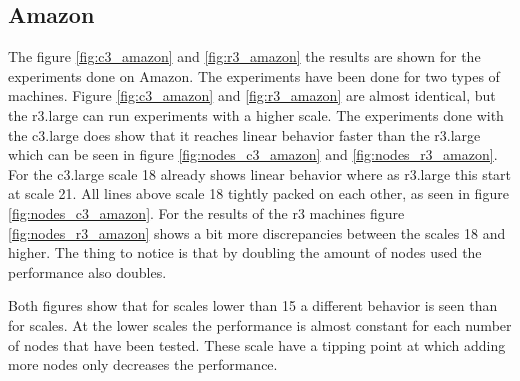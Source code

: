 \subsection{Amazon}
\label{res:amazon}
The figure \ref{fig:c3_amazon} and \ref{fig:r3_amazon} the results are shown for the experiments done on Amazon. The experiments have been done for two types of machines. Figure \ref{fig:c3_amazon} and \ref{fig:r3_amazon} are almost identical, but the r3.large can run experiments with a higher scale. The experiments done with the c3.large does show that it reaches linear behavior faster than the r3.large which can be seen in figure \ref{fig:nodes_c3_amazon} and \ref{fig:nodes_r3_amazon}. For the c3.large scale 18 already shows linear behavior where as r3.large this start at scale 21. All lines above scale 18 tightly packed on each other, as seen in figure \ref{fig:nodes_c3_amazon}.
 For the results of the r3 machines figure \ref{fig:nodes_r3_amazon} shows a bit more discrepancies between the scales 18 and higher. The thing to notice is that by doubling the amount of nodes used the performance also doubles.
 
 Both figures show that for scales lower than 15 a different behavior is seen than for scales. At the lower scales the performance is almost constant for each number of nodes that have been tested. These scale have a tipping point at which adding more nodes only decreases the performance. 

